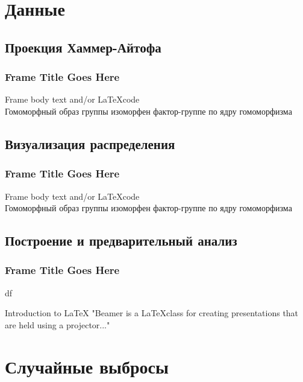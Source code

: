 \documentclass[14pt,aspectratio=43]{beamer}
\begin{document}
\section{Данные}\label{sub:smthzd}
\subsection{Проекция Хаммер-Айтофа}\label{sub:hammer}
\begin{frame}[<alignment>]
\frametitle{Frame Title Goes Here}
Frame body text and/or \LaTeX code\\



Гомоморфный образ группы
изоморфен фактор-группе
по ядру гомоморфизма

\end{frame}	


\subsection{Визуализация распределения}\label{sub:smthrs}
\begin{frame}[<alignment>]
\frametitle{Frame Title Goes Here}
Frame body text and/or \LaTeX code\\

Гомоморфный образ группы
изоморфен фактор-группе
по ядру гомоморфизма

\end{frame}	


\subsection{Построение и предварительный анализ}\label{errvid}

\begin{frame}[c]
\frametitle{Frame Title Goes Here}
df
\begin{block}{Introduction to {\LaTeX}}
"Beamer is a {\LaTeX}class for creating presentations that
are held using a projector..."
\end{block}

\end{frame}	

\section{Случайные выбросы}\label{sub:smthrs}
\end{document}
